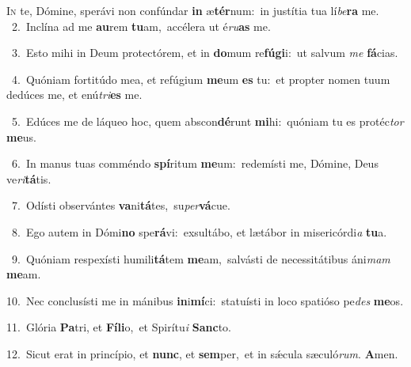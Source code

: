 \lettrine{\initial\textcolor{\initialcolor}{I}}{n} te, Dómine, sperávi non confúndar \textbf{in} æ\-\textbf{tér}\-num:~\star in justítia tua lí\-\textit{be}\-\textbf{ra} me.\\
{\numbfont\textcolor{\numbcolor}{~2.}}~Inclína ad me \textbf{au}\-rem \textbf{tu}\-am,~\star accélera ut é\-\textit{ru}\-\textbf{as} me.\par
{\numbfont\textcolor{\numbcolor}{~3.}}~Esto mihi in Deum protectórem, et in \textbf{do}\-mum re\-\textbf{fú}\-\textbf{gi}i:~\star ut salvum \textit{me} \textbf{fá}\-cias.\par
{\numbfont\textcolor{\numbcolor}{~4.}}~Quóniam fortitúdo mea, et refúgium \textbf{me}\-um \textbf{es} tu:~\star et propter nomen tuum dedúces me, et enú\-\textit{tri}\-\textbf{es} me.\par
{\numbfont\textcolor{\numbcolor}{~5.}}~Edúces me de láqueo hoc, quem abscon\-\textbf{dé}\-runt \textbf{mi}\-hi:~\star quóniam tu es protéc\textit{tor} \textbf{me}\-us.\par
{\numbfont\textcolor{\numbcolor}{~6.}}~In manus tuas comméndo \textbf{spí}\-ritum \textbf{me}\-um:~\star redemísti me, Dómine, Deus ve\-\textit{ri}\-\textbf{tá}tis.\par
{\numbfont\textcolor{\numbcolor}{~7.}}~Odísti observántes \textbf{va}\-ni\-\textbf{tá}\-tes,~\star su\-\textit{per}\-\textbf{vá}cue.\par
{\numbfont\textcolor{\numbcolor}{~8.}}~Ego autem in Dómi\textbf{no} spe\-\textbf{rá}\-vi:~\star exsultábo, et lætábor in misericórdi\textit{a} \textbf{tu}\-a.\par
{\numbfont\textcolor{\numbcolor}{~9.}}~Quóniam respexísti humili\-\textbf{tá}\-tem \textbf{me}\-am,~\star salvásti de necessitátibus áni\textit{mam} \textbf{me}\-am.\par
{\numbfont\textcolor{\numbcolor}{10.}}~Nec conclusísti me in mánibus \textbf{in}\-i\-\textbf{mí}\-ci:~\star statuísti in loco spatióso pe\textit{des} \textbf{me}\-os.\par
{\numbfont\textcolor{\numbcolor}{11.}}~Glória \textbf{Pa}\-tri, et \textbf{Fí}\-\textbf{li}o,~\star et Spirítu\textit{i} \textbf{Sanc}\-to.\par
{\numbfont\textcolor{\numbcolor}{12.}}~Sicut erat in princípio, et \textbf{nunc}\-, et \textbf{sem}\-per,~\star et in sǽcula sæculó\-\textit{rum}\-. \textbf{A}\-men.\par
